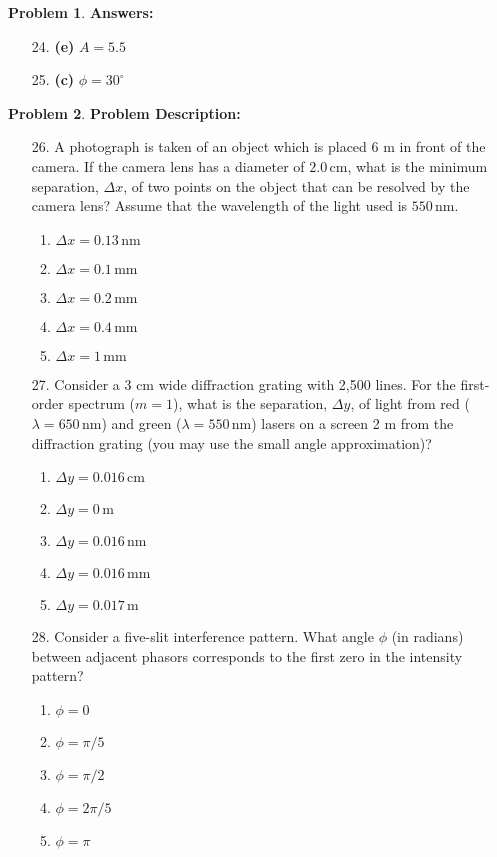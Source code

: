 \documentclass[12pt]{article}
\theoremstyle{definition} %
\newtheorem{problem}{Problem}
\theoremstyle{plain} %
\begin{document}
\begin{problem}
\textbf{Answers:}
\begin{enumerate}
    \item[24.] \textbf{(e)} \(A = 5.5\)
    \item[25.] \textbf{(c)} \(\phi = 30^\circ\)
\end{enumerate}
\end{problem}
\begin{problem}
    \textbf{Problem Description:}

\begin{enumerate}
    \item[26.] A photograph is taken of an object which is placed 6 m in front of the camera. If the camera lens has a diameter of \(2.0 \, \text{cm}\), what is the minimum separation, \(\Delta x\), of two points on the object that can be resolved by the camera lens? Assume that the wavelength of the light used is \(550 \, \text{nm}\).
    \begin{enumerate}
        \item \(\Delta x = 0.13 \, \text{nm}\)
        \item \(\Delta x = 0.1 \, \text{mm}\)
        \item \textbf{\(\Delta x = 0.2 \, \text{mm}\)}
        \item \(\Delta x = 0.4 \, \text{mm}\)
        \item \(\Delta x = 1 \, \text{mm}\)
    \end{enumerate}

    \item[27.] Consider a 3 cm wide diffraction grating with 2,500 lines. For the first-order spectrum (\(m = 1\)), what is the separation, \(\Delta y\), of light from red (\( \lambda = 650 \, \text{nm} \)) and green (\( \lambda = 550 \, \text{nm} \)) lasers on a screen 2 m from the diffraction grating (you may use the small angle approximation)?
    \begin{enumerate}
        \item \(\Delta y = 0.016 \, \text{cm}\)
        \item \(\Delta y = 0 \, \text{m}\)
        \item \(\Delta y = 0.016 \, \text{nm}\)
        \item \(\Delta y = 0.016 \, \text{mm}\)
        \item \textbf{\(\Delta y = 0.017 \, \text{m}\)}
    \end{enumerate}

    \item[28.] Consider a five-slit interference pattern. What angle \(\phi\) (in radians) between adjacent phasors corresponds to the first zero in the intensity pattern?
    \begin{enumerate}
        \item \(\phi = 0\)
        \item \(\phi = \pi / 5\)
        \item \(\phi = \pi / 2\)
        \item \textbf{\(\phi = 2\pi / 5\)}
        \item \(\phi = \pi\)
    \end{enumerate}


\end{enumerate}
\end{problem}
\end{document}
